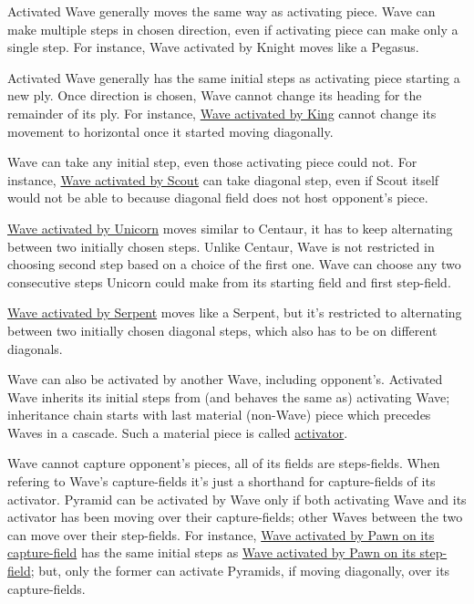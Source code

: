 
Activated Wave generally moves the same way as activating piece. Wave can make
multiple steps in chosen direction, even if activating piece can make only a
single step. For instance, Wave activated by Knight moves like a Pegasus.

Activated Wave generally has the same initial steps as activating piece starting
a new ply. Once direction is chosen, Wave cannot change its heading for the
remainder of its ply. For instance,
\hyperref[fig:scn_mv_20_wave_activated_by_king]{Wave activated by King} cannot
change its movement to horizontal once it started moving diagonally.

Wave can take any initial step, even those activating piece could not. For instance,
\hyperref[fig:scn_hd_25_scout_activating_wave_step_fields_end]{Wave activated by Scout}
can take diagonal step, even if Scout itself would not be able to because diagonal
field does not host opponent's piece.

\hyperref[fig:scn_mv_27_wave_activation_by_unicorn_first_step]{Wave activated by Unicorn}
moves similar to Centaur, it has to keep alternating between two initially chosen
steps. Unlike Centaur, Wave is not restricted in choosing second step based on a
choice of the first one. Wave can choose any two consecutive steps Unicorn could
make from its starting field and first step-field.

\hyperref[fig:scn_tr_31_serpent_activating_wave]{Wave activated by Serpent} moves
like a Serpent, but it's restricted to alternating between two initially chosen
diagonal steps, which also has to be on different diagonals.

Wave can also be activated by another Wave, including opponent's. Activated Wave
inherits its initial steps from (and behaves the same as) activating Wave;
inheritance chain starts with last material (non-Wave) piece which precedes Waves
in a cascade. Such a material piece is called
\hyperref[sec:Terms/Activator]{activator}.

Wave cannot capture opponent's pieces, all of its fields are steps-fields. When
refering to Wave's capture-fields it's just a shorthand for capture-fields of its
activator. Pyramid can be activated by Wave only if both activating Wave and its
activator has been moving over their capture-fields; other Waves between the two
can move over their step-fields.\newline
\indent
For instance,
\hyperref[fig:scn_mv_24_wave_activated_by_capture_pawn]{Wave activated by Pawn on its capture-field}
has the same initial steps as
\hyperref[fig:scn_mv_22_wave_activated_by_step_pawn]{Wave activated by Pawn on its step-field};
but, only the former can activate Pyramids, if moving diagonally, over its
capture-fields.

